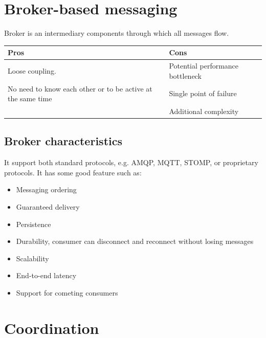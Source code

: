 \section{Broker-based messaging}

Broker is an intermediary components through which all messages flow.

\begin{table}[h!]
  \renewcommand{\arraystretch}{1.4}
  \centering
  \begin{tabular}{ll}
    \toprule
    \textbf{Pros}                                               & \textbf{Cons}                    \\
    \midrule
    Loose coupling.                                             & Potential performance bottleneck \\
    No need to know each other or to be active at the same time & Single point of failure          \\
                                                                & Additional complexity            \\
    \bottomrule
  \end{tabular}
\end{table}



\subsection{Broker characteristics}

It support both standard protocols, e.g. AMQP, MQTT, STOMP, or proprietary protocols.
It has some good feature such as:

\begin{itemize}
  \item Messaging ordering
  \item Guaranteed delivery
  \item Persistence
  \item Durability, consumer can disconnect and reconnect without losing messages
  \item Scalability
  \item End-to-end latency
  \item Support for cometing consumers
\end{itemize}


\section{Coordination}

